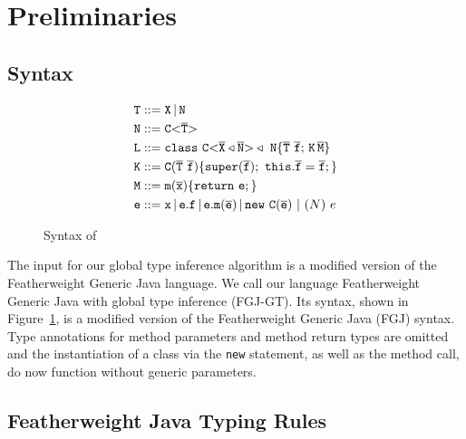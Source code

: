 \section{Preliminaries}
\label{sec:preliminaries}
\subsection{Syntax}
\begin{figure}[tp]
\begin{align*}
  {\tt T} &::= {\tt X} \, | \, {\tt N} \\
  {\tt N} &::= \mathtt{C {\tt <} \overline{\tt T} {\tt >} }\\
  {\tt L} &::= \mathtt{class} \ \mathtt{C {\tt <} \overline{\tt X} \triangleleft \overline{\tt N} {\tt >} }
             \triangleleft \ {\tt N} \{ \overline{\tt T} \ \overline{\tt f}; \,{\tt K} \, \overline{\tt M} \} \\
  {\tt K} &::= {\tt C}(\overline{\tt T} \ \overline{\tt f})\{\mathtt{super}(\overline{\tt f}); \ \mathtt{this}.\overline{\tt f}=\overline{\tt f};\} \\
  {\tt M} &::= \mathtt{m}(\overline{\tt x})\{ \mathtt{ return}\ {\tt e}; \} \\
  {\tt e} &::= {\tt x} \, | \, {\tt e}.{\tt f} \, | \,
             {\tt e}.\mathtt{m}(\overline{\tt e}) \, | \, \mathtt{new}\ \mathtt{C}(\overline{\tt e})
             \ |\ (N)\ e
\end{align*}
  \caption{Syntax of \TFGJ}
  \label{fig:syntax-tfgj}
\end{figure}
The input for our global type inference algorithm is a modified version of the Featherweight Generic Java language.
We call our language Featherweight Generic Java with global type inference (FGJ-GT).
Its syntax, shown in Figure~\ref{fig:syntax-tfgj}, is a modified version of the Featherweight Generic Java (FGJ) syntax. 
Type annotations for method parameters and method return types are omitted %
and the instantiation of a class via the \texttt{new} statement, as well as the method call, do now function without generic parameters.

\subsection{Featherweight Java Typing Rules}\label{chapter:type-rules}


